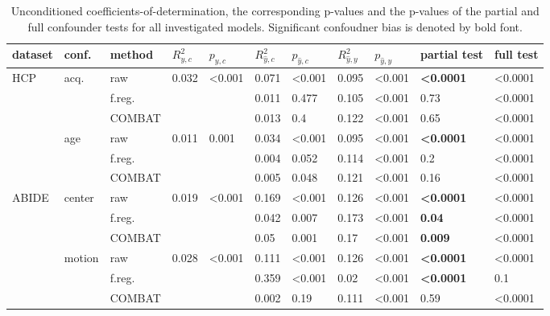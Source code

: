 \documentclass{article}
\begin{document}
\renewcommand{\arraystretch}{1.2}
\begin{table}
\centering
\begin{tabular}{lll|ll|ll|ll|ll} 
dataset & conf. & method & $R^2_{y, c}$ & $p_{y, c}$ & $R^2_{\hat{y}, c}$ & $p_{\hat{y}, c}$ & $R^2_{\hat{y}, y}$ & $p_{\hat{y}, y}$ & partial test & full test  \\
\hline
HCP & acq.  & raw      & 0.032 & <0.001 & 0.071 & <0.001  & 0.095 & <0.001 & \textbf{<0.0001} & <0.0001 \\
    &              & f.reg.    & & & 0.011 & 0.477 & 0.105  & <0.001  & 0.73 & <0.0001 \\
    &              & COMBAT    & & &0.013 & 0.4 & 0.122  & <0.001  & 0.65 & <0.0001\\
\hline
    & age   & raw       & 0.011 & 0.001  & 0.034 & <0.001  & 0.095  & <0.001 & \textbf{<0.0001} & <0.0001 \\
    &       & f.reg.    & & &0.004 & 0.052 & 0.114  & <0.001  & 0.2 & <0.0001 \\
    &       & COMBAT    & & &0.005 & 0.048 & 0.121 & <0.001 & 0.16 & <0.0001 \\
\hline
ABIDE   & center   & raw       & 0.019  & <0.001 &  0.169 & <0.001& 0.126     & <0.001 & \textbf{<0.0001} & <0.0001 \\
        &          & f.reg.    &  & &  0.042 & 0.007 & 0.173     & <0.001 & \textbf{0.04} & <0.0001 \\
        &          & COMBAT    &  & &  0.05 & 0.001 & 0.17     & <0.001 & \textbf{0.009} & <0.0001 \\
\hline
        & motion   & raw       & 0.028 & <0.001 & 0.111    &  <0.001 & 0.126    & <0.001 & \textbf{<0.0001} & <0.0001 \\
        &          & f.reg.    & & & 0.359    & <0.001  & 0.02   & <0.001 & \textbf{<0.0001} & 0.1 \\
        &          & COMBAT    & & &  0.002 & 0.19 & 0.111     & <0.001 & 0.59 & <0.0001 \\
    

\end{tabular}
\caption{\label{tab:unconditional-pvals} Unconditioned coefficients-of-determination, the corresponding p-values and the p-values of the partial and full confounder tests for all investigated models. Significant confoudner bias is denoted by bold font.}
\end{table}

\end{document}
